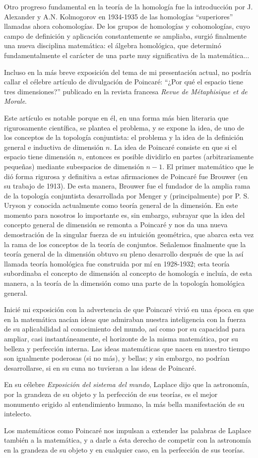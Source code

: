 \documentclass[a4paper, 12pt]{article}
\begin{document}
Otro progreso fundamental en la teoría de la homología fue la introducción por J. Alexander y A.N. Kolmogorov en 1934-1935 de las homologías ``superiores'' llamadas ahora cohomologías. De los grupos de homologías y cohomologías, cuyo campo de definición y aplicación constantemente se ampliaba, surgió finalmente una nueva disciplina matemática: el álgebra homológica, que determinó fundamentalmente el carácter de una parte muy significativa de la matemática...

Incluso en la más breve exposición del tema de mi presentación actual, no podría callar el célebre artículo de divulgación de Poincaré: ``¿Por qué el espacio tiene tres dimensiones?''  publicado en la revista francesa {\it Revue de Métaphisique et de Morale}.

Este artículo es notable porque en él, en una forma más bien literaria que rigurosamente científica, se plantea el problema, y se expone la idea, de uno de los conceptos de la topología conjuntista: el problema y la idea de la definición general e inductiva de dimensión $n$. La idea de Poincaré consiste en que si el espacio tiene dimensión $n$, entonces es posible dividirlo en partes (arbitrariamente pequeñas) mediante subespacios de dimensión $n-1$. El primer matemático que le dió forma rigurosa y definitiva a estas afirmaciones de Poincaré fue Brouwer (en su trabajo de 1913). De esta manera, Brouwer
fue el fundador de la amplia rama de la topología conjuntista desarrollada por Menger y (principalmente) por P. S. Uryson y conocida actualmente como teoría general de la dimensión. En este momento para nosotros lo importante es, sin embargo, subrayar que la idea del concepto general de dimensión se remonta a Poincaré y nos da una nueva demostración de la singular fuerza de su intuición geométrica, que abarca esta vez la rama de los conceptos de la teoría de conjuntos. Señalemos finalmente que la teoría general de la dimensión obtuvo su pleno desarrollo después de que la así llamada teoría homológica fue construida por mí en 1928-1932; esta teoría subordinaba el concepto de dimensión al concepto de homología e incluía, de esta manera, a la teoría de la dimensión como una parte de la topología homológica general.

Inicié mi exposición con la advertencia de que Poincaré vivió en una época en que en la matemática nacían ideas que admiraban nuestra inteligencia con la fuerza de su aplicabilidad al conocimiento del mundo, así como por su capacidad para ampliar, casi instantáneamente, el horizonte de la misma matemática, por su belleza y perfección interna.
 Las ideas matemáticas que nacen en nuestro tiempo son igualmente poderosas (si no más), y bellas; y sin embargo, no podrían desarrollarse, si en su cuna no tuvieran a las ideas de Poincaré.
 
En su célebre {\it Exposición del sistema del mundo}, Laplace dijo que la astronomía, por la grandeza de su objeto y la perfección de sus teorías, es el mejor monumento erigido al entendimiento humano, la más bella manifestación de su intelecto.

Los matemáticos como Poincaré nos impulsan a extender las palabras de Laplace también a la matemática, y a darle a ésta derecho de competir con la astronomía en la grandeza de su objeto y en cualquier caso, en la perfección de sus teorías.
\end{document}
